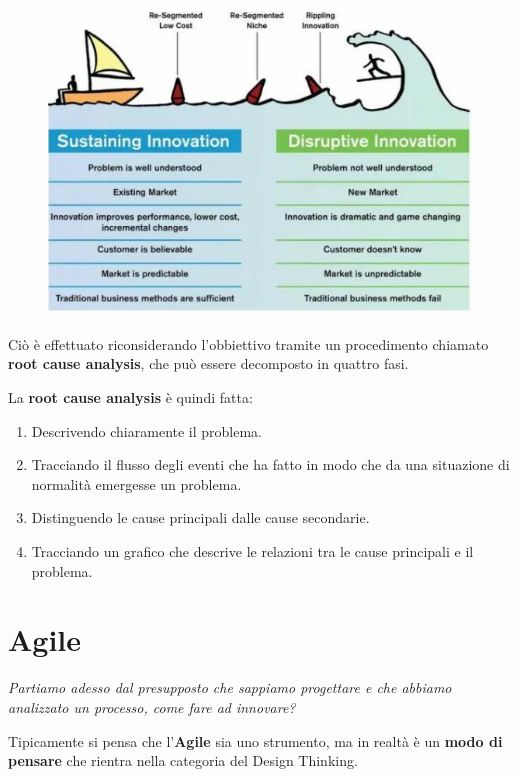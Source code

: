 \documentclass[a4paper,11pt,oneside]{book}
\begin{document}
\begin{figure}[!h]
	\centering
	\includegraphics[scale=0.6]{"immagini/Disruptive Innovation"}
\end{figure}

Ciò è effettuato riconsiderando l'obbiettivo tramite un procedimento chiamato \textbf{root cause analysis}, che può essere decomposto in quattro fasi.

La \textbf{root cause analysis} è quindi fatta:

\begin{enumerate}
	\item Descrivendo chiaramente il problema.
	\item Tracciando il flusso degli eventi che ha fatto in modo che da una situazione di normalità emergesse un problema.
	\item Distinguendo le cause principali dalle cause secondarie.
	\item Tracciando un grafico che descrive le relazioni tra le cause principali e il problema.
\end{enumerate}

\section{Agile}
\begin{flushleft}
	\textit{Partiamo adesso dal presupposto che sappiamo progettare e che abbiamo analizzato un
		processo, come fare ad innovare?}
\end{flushleft}

Tipicamente si pensa che l'\textbf{Agile} sia uno strumento, ma in realtà è un \textbf{modo di pensare}
che rientra nella categoria del Design Thinking.
\end{document}
